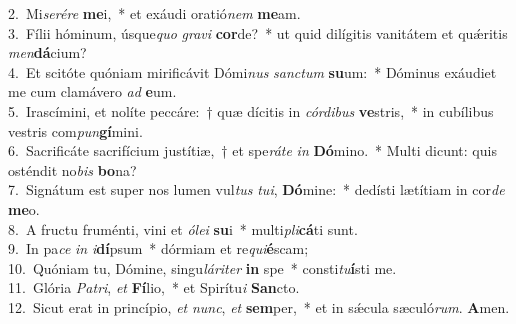 {2.~}Mi\textit{se}\textit{ré}\textit{re} \textbf{me}i,~* et exáudi oratió\textit{nem} \textbf{me}am.\\
{3.~}Fílii hóminum, úsque\textit{quo} \textit{gra}\textit{vi} \textbf{cor}de?~* ut quid dilígitis vanitátem et quǽritis \textit{men}\textbf{dá}cium?\\
{4.~}Et scitóte quóniam mirificávit Dómi\textit{nus} \textit{san}\textit{ctum} \textbf{su}um:~* Dóminus exáudiet me cum clamávero \textit{ad} \textbf{e}um.\\
{5.~}Irascímini, et nolíte peccáre:~† quæ dícitis in \textit{cór}\textit{di}\textit{bus} \textbf{ve}stris,~* in cubílibus vestris com\textit{pun}\textbf{gí}mini.\\
{6.~}Sacrificáte sacrifícium justítiæ,~† et spe\textit{rá}\textit{te} \textit{in} \textbf{Dó}mino.~* Multi dicunt: quis osténdit no\textit{bis} \textbf{bo}na?\\
{7.~}Signátum est super nos lumen vul\textit{tus} \textit{tu}\textit{i}, \textbf{Dó}mine:~* dedísti lætítiam in cor\textit{de} \textbf{me}o.\\
{8.~}A fructu fruménti, vini et \textit{ó}\textit{le}\textit{i} \textbf{su}i~* multi\textit{pli}\textbf{cá}ti sunt.\\
{9.~}In pa\textit{ce} \textit{in} \textit{i}\textbf{dí}psum~* dórmiam et re\textit{qui}\textbf{é}scam;\\
{10.~}Quóniam tu, Dómine, singu\textit{lá}\textit{ri}\textit{ter} \textbf{in} spe~* consti\textit{tu}\textbf{í}sti me.\\
{11.~}Glória \textit{Pa}\textit{tri}, \textit{et} \textbf{Fí}lio,~* et Spirítu\textit{i} \textbf{San}cto.\\
{12.~}Sicut erat in princípio, \textit{et} \textit{nunc}, \textit{et} \textbf{sem}per,~* et in sǽcula sæculó\textit{rum}. \textbf{A}men.\\
